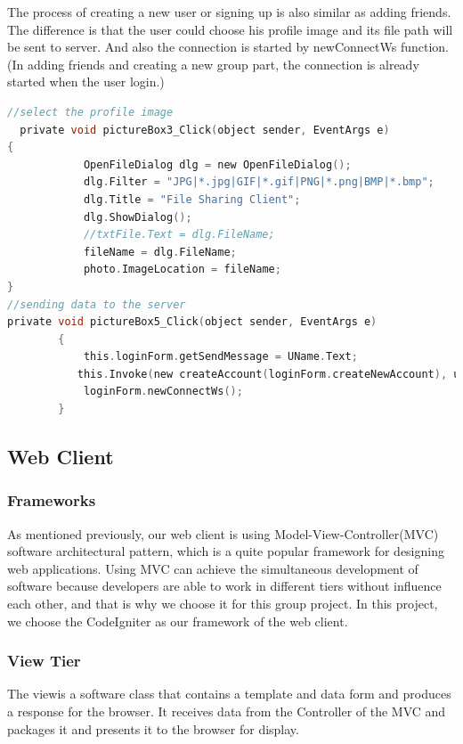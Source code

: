 \documentclass[a4paper,11pt]{article}
\begin{document}
\begin{itemize}
The process of creating a new user or signing up is also similar as adding friends. The difference is that the user could choose his profile image and  its file path will be sent to server. And also the connection is started by 
newConnectWs function. (In adding friends and creating a new group part, the connection is already started when the user login.)
\begin{lstlisting}[language=C]
//select the profile image 
  private void pictureBox3_Click(object sender, EventArgs e)
{
            OpenFileDialog dlg = new OpenFileDialog();
            dlg.Filter = "JPG|*.jpg|GIF|*.gif|PNG|*.png|BMP|*.bmp";
            dlg.Title = "File Sharing Client";
            dlg.ShowDialog();
            //txtFile.Text = dlg.FileName;
            fileName = dlg.FileName;
            photo.ImageLocation = fileName;
}
//sending data to the server
private void pictureBox5_Click(object sender, EventArgs e)
        {
            this.loginForm.getSendMessage = UName.Text;
           this.Invoke(new createAccount(loginForm.createNewAccount), username, password, profile);
            loginForm.newConnectWs();
        }
\end{lstlisting}

\end{itemize}










\subsection{Web Client}

\subsubsection{Frameworks}
As mentioned previously, our web client is using Model-View-Controller(MVC) software architectural pattern, which is a quite popular framework for designing web applications. Using MVC can achieve the simultaneous development of software because developers are able to work in different tiers without influence each other, and that is why we choose it for this group project. In this project, we choose the CodeIgniter as our framework of the web client.

\subsubsection*{View Tier}
The viewis a software class that contains a template and data form and produces a response for the browser. It receives data from the Controller of the MVC and packages it and presents it to the browser for display.
\end{document}
